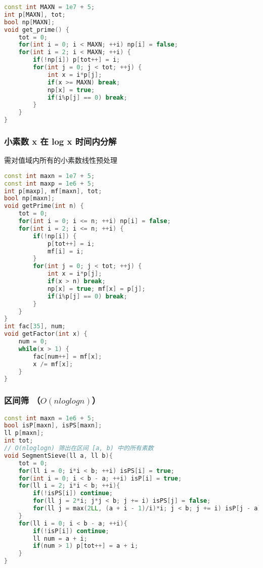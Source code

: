 \begin{lstlisting}[language=C++]
const int MAXN = 1e7 + 5;
int p[MAXN], tot;
bool np[MAXN];
void get_prime() {
    tot = 0;
    for(int i = 0; i < MAXN; ++i) np[i] = false;
    for(int i = 2; i < MAXN; ++i) {
        if(!np[i]) p[tot++] = i;
        for(int j = 0; j < tot; ++j) {
            int x = i*p[j];
            if(x >= MAXN) break;
            np[x] = true;
            if(i%p[j] == 0) break;
        }
    }
}
\end{lstlisting}

\subsubsection{小素数 x 在 log x 时间内分解}

需对值域内所有的小素数线性预处理

\begin{lstlisting}[language=C++]
const int maxn = 1e7 + 5;
const int maxp = 1e6 + 5;
int p[maxp], mf[maxn], tot;
bool np[maxn];
void getPrime(int n) {
    tot = 0;
    for(int i = 0; i <= n; ++i) np[i] = false;
    for(int i = 2; i <= n; ++i) {
        if(!np[i]) {
            p[tot++] = i;
            mf[i] = i;
        }
        for(int j = 0; j < tot; ++j) {
            int x = i*p[j];
            if(x > n) break;
            np[x] = true; mf[x] = p[j];
            if(i%p[j] == 0) break;
        }
    }
}
int fac[35], num;
void getFactor(int x) {
    num = 0;
    while(x > 1) {
        fac[num++] = mf[x];
        x /= mf[x];
    }
}
\end{lstlisting}

\subsubsection{区间筛 （$O(nloglogn)$）}


\begin{lstlisting}[language=C++]
const int maxn = 1e6 + 5;
bool isP[maxn], isPS[maxn];
ll p[maxn];
int tot;
// O(nloglogn) 筛出在区间 [a, b) 中的所有素数
void SegmentSieve(ll a, ll b){
    tot = 0;
    for(ll i = 0; i*i < b; ++i) isPS[i] = true;
    for(int i = 0; i < b - a; ++i) isP[i] = true;
    for(ll i = 2; i*i < b; ++i){
        if(!isPS[i]) continue;
        for(ll j = 2*i; j*j < b; j += i) isPS[j] = false;
        for(ll j = max(2LL, (a + i - 1)/i)*i; j < b; j += i) isP[j - a] = false;
    }
    for(ll i = 0; i < b - a; ++i){
        if(!isP[i]) continue;
        ll num = a + i;
        if(num > 1) p[tot++] = a + i;
    }
}
\end{lstlisting}

